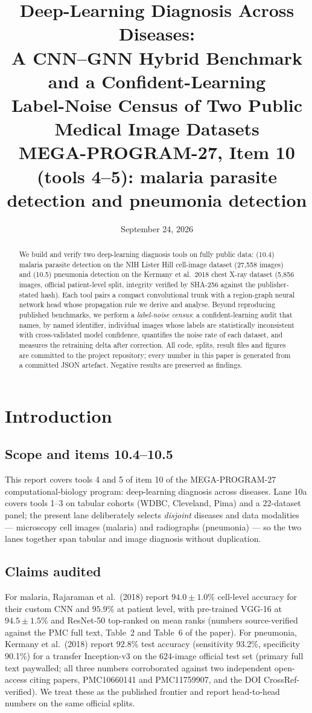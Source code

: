 \documentclass[11pt]{article}
\title{\textbf{Deep-Learning Diagnosis Across Diseases:\\
A CNN--GNN Hybrid Benchmark and a Confident-Learning\\Label-Noise Census of Two Public Medical Image Datasets}\\[6pt]
\large MEGA-PROGRAM-27, Item 10 (tools 4--5): malaria parasite detection and pneumonia detection}
\author{}
\date{September 24, 2026}
\theoremstyle{definition}
\begin{document}
\maketitle
\begin{abstract}
We build and verify two deep-learning diagnosis tools on fully public data:
(10.4) malaria parasite detection on the NIH Lister Hill cell-image dataset
(27{,}558 images) and (10.5) pneumonia detection on the Kermany et al.\ 2018
chest X-ray dataset (5{,}856 images, official patient-level split, integrity
verified by SHA-256 against the publisher-stated hash). Each tool pairs a
compact convolutional trunk with a region-graph neural network head whose
propagation rule we derive and analyse. Beyond reproducing published
benchmarks, we perform a \emph{label-noise census}: a confident-learning
audit that names, by named identifier, individual images whose
labels are statistically inconsistent with cross-validated model confidence,
quantifies the noise rate of each dataset, and measures the retraining delta
after correction. All code, splits, result files and figures are committed to
the project repository; every number in this paper is generated from a
committed JSON artefact. Negative results are preserved as findings.
\end{abstract}
\tableofcontents
\newpage

\section{Introduction}
\subsection{Scope and items 10.4--10.5}
This report covers tools 4 and 5 of item 10 of the MEGA-PROGRAM-27
computational-biology program: deep-learning diagnosis across diseases. Lane
10a covers tools 1--3 on tabular cohorts (WDBC, Cleveland, Pima) and a
22-dataset panel; the present lane deliberately selects \emph{disjoint}
diseases and data modalities --- microscopy cell images (malaria) and
radiographs (pneumonia) --- so the two lanes together span tabular and image
diagnosis without duplication.

\subsection{Claims audited}
For malaria, Rajaraman et al.\ (2018) report $94.0 \pm 1.0$\% cell-level
accuracy for their custom CNN and $95.9$\% at patient level, with pre-trained
VGG-16 at $94.5 \pm 1.5$\% and ResNet-50 top-ranked on mean ranks (numbers
source-verified against the PMC full text, Table~2 and Table~6 of the paper).
For pneumonia, Kermany et al.\ (2018) report 92.8\% test accuracy
(sensitivity 93.2\%, specificity 90.1\%) for a transfer Inception-v3 on the
624-image official test set (primary full text paywalled; all three numbers
corroborated against two independent open-access citing papers, PMC10660141
and PMC11759907, and the DOI CrossRef-verified). We treat these as the published frontier and
report head-to-head numbers on the same official splits.
\end{document}
